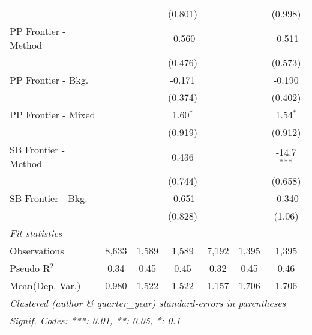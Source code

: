 \begin{tabular}{lcccccc}
                        &                &         & (0.801)    &               &         & (0.998)\\   
   PP Frontier - Method &                &         & -0.560     &               &         & -0.511\\   
                        &                &         & (0.476)    &               &         & (0.573)\\   
   PP Frontier - Bkg.   &                &         & -0.171     &               &         & -0.190\\   
                        &                &         & (0.374)    &               &         & (0.402)\\   
   PP Frontier - Mixed  &                &         & 1.60$^{*}$ &               &         & 1.54$^{*}$\\   
                        &                &         & (0.919)    &               &         & (0.912)\\   
   SB Frontier - Method &                &         & 0.436      &               &         & -14.7$^{***}$\\   
                        &                &         & (0.744)    &               &         & (0.658)\\   
   SB Frontier - Bkg.   &                &         & -0.651     &               &         & -0.340\\   
                        &                &         & (0.828)    &               &         & (1.06)\\   
   \midrule
   \emph{Fit statistics}\\
   Observations         & 8,633          & 1,589   & 1,589      & 7,192         & 1,395   & 1,395\\  
   Pseudo R$^2$         & 0.34           & 0.45    & 0.45       & 0.32          & 0.45    & 0.46\\  
Mean(Dep. Var.) & 0.980 & 1.522 & 1.522 & 1.157 & 1.706 & 1.706 \\
   \midrule \midrule
   \multicolumn{7}{l}{\emph{Clustered (author \& quarter\_year) standard-errors in parentheses}}\\
   \multicolumn{7}{l}{\emph{Signif. Codes: ***: 0.01, **: 0.05, *: 0.1}}\\
\end{tabular}
\par\endgroup
